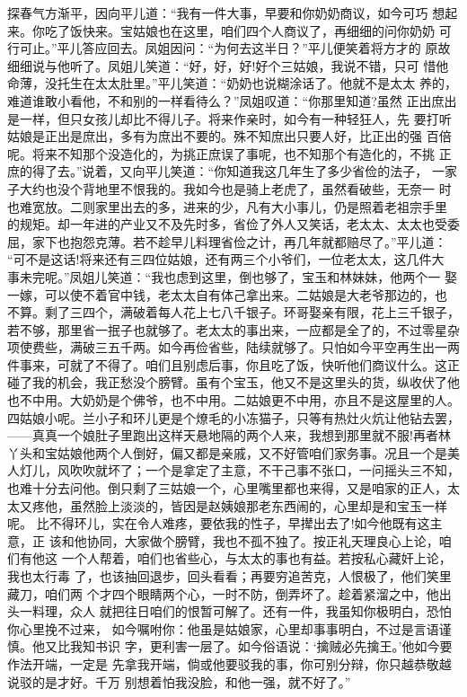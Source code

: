 探春气方渐平，因向平儿道：“我有一件大事，早要和你奶奶商议，如今可巧
想起来。你吃了饭快来。宝姑娘也在这里，咱们四个人商议了，再细细的问你奶奶
可行可止。”平儿答应回去。凤姐因问：“为何去这半日？”平儿便笑着将方才的
原故细细说与他听了。凤姐儿笑道：“好，好，好!好个三姑娘，我说不错，只可
惜他命薄，没托生在太太肚里。”平儿笑道：“奶奶也说糊涂话了。他就不是太太
养的，难道谁敢小看他，不和别的一样看待么？”凤姐叹道：“你那里知道?虽然
正出庶出是一样，但只女孩儿却比不得儿子。将来作亲时，如今有一种轻狂人，先
要打听姑娘是正出是庶出，多有为庶出不要的。殊不知庶出只要人好，比正出的强
百倍呢。将来不知那个没造化的，为挑正庶误了事呢，也不知那个有造化的，不挑
正庶的得了去。”说着，又向平儿笑道：“你知道我这几年生了多少省俭的法子，
一家子大约也没个背地里不恨我的。我如今也是骑上老虎了，虽然看破些，无奈一
时也难宽放。二则家里出去的多，进来的少，凡有大小事儿，仍是照着老祖宗手里
的规矩。却一年进的产业又不及先时多，省俭了外人又笑话，老太太、太太也受委
屈，家下也抱怨克薄。若不趁早儿料理省俭之计，再几年就都赔尽了。”平儿道：
“可不是这话!将来还有三四位姑娘，还有两三个小爷们，一位老太太，这几件大
事未完呢。”凤姐儿笑道：“我也虑到这里，倒也够了，宝玉和林妹妹，他两个一
娶一嫁，可以使不着官中钱，老太太自有体己拿出来。二姑娘是大老爷那边的，也
不算。剩了三四个，满破着每人花上七八千银子。环哥娶亲有限，花上三千银子，
若不够，那里省一抿子也就够了。老太太的事出来，一应都是全了的，不过零星杂
项使费些，满破三五千两。如今再俭省些，陆续就够了。只怕如今平空再生出一两
件事来，可就了不得了。咱们且别虑后事，你且吃了饭，快听他们商议什么。这正
碰了我的机会，我正愁没个膀臂。虽有个宝玉，他又不是这里头的货，纵收伏了他
也不中用。大奶奶是个佛爷，也不中用。二姑娘更不中用，亦且不是这屋里的人。
四姑娘小呢。兰小子和环儿更是个燎毛的小冻猫子，只等有热灶火炕让他钻去罢，
——真真一个娘肚子里跑出这样天悬地隔的两个人来，我想到那里就不服!再者林
丫头和宝姑娘他两个人倒好，偏又都是亲戚，又不好管咱们家务事。况且一个是美
人灯儿，风吹吹就坏了；一个是拿定了主意，不干己事不张口，一问摇头三不知，
也难十分去问他。倒只剩了三姑娘一个，心里嘴里都也来得，又是咱家的正人，太
太又疼他，虽然脸上淡淡的，皆因是赵姨娘那老东西闹的，心里却是和宝玉一样呢。
比不得环儿，实在令人难疼，要依我的性子，早撵出去了!如今他既有这主意，正
该和他协同，大家做个膀臂，我也不孤不独了。按正礼天理良心上论，咱们有他这
一个人帮着，咱们也省些心，与太太的事也有益。若按私心藏奸上论，我也太行毒
了，也该抽回退步，回头看看；再要穷追苦克，人恨极了，他们笑里藏刀，咱们两
个才四个眼睛两个心，一时不防，倒弄坏了。趁着紧溜之中，他出头一料理，众人
就把往日咱们的恨暂可解了。还有一件，我虽知你极明白，恐怕你心里挽不过来，
如今嘱咐你：他虽是姑娘家，心里却事事明白，不过是言语谨慎。他又比我知书识
字，更利害一层了。如今俗语说：‘擒贼必先擒王。’他如今要作法开端，一定是
先拿我开端，倘或他要驳我的事，你可别分辩，你只越恭敬越说驳的是才好。千万
别想着怕我没脸，和他一强，就不好了。”

